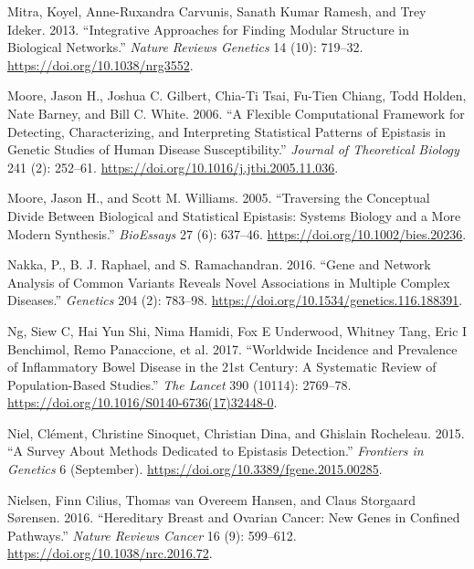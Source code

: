 \documentclass[
  11pt,
]{env/yjiao}
\newlength{\cslhangindent}
\newenvironment{cslreferences}%
  {\setlength{\parindent}{0pt}%
  \everypar{\setlength{\hangindent}{\cslhangindent}}\ignorespaces}%
  {\par}
\begin{document}
\begin{cslreferences}
\leavevmode\hypertarget{ref-mitra_integrative_2013}{}%
Mitra, Koyel, Anne-Ruxandra Carvunis, Sanath Kumar Ramesh, and Trey Ideker. 2013. ``Integrative Approaches for Finding Modular Structure in Biological Networks.'' \emph{Nature Reviews Genetics} 14 (10): 719--32. \url{https://doi.org/10.1038/nrg3552}.

\leavevmode\hypertarget{ref-moore_flexible_2006}{}%
Moore, Jason H., Joshua C. Gilbert, Chia-Ti Tsai, Fu-Tien Chiang, Todd Holden, Nate Barney, and Bill C. White. 2006. ``A Flexible Computational Framework for Detecting, Characterizing, and Interpreting Statistical Patterns of Epistasis in Genetic Studies of Human Disease Susceptibility.'' \emph{Journal of Theoretical Biology} 241 (2): 252--61. \url{https://doi.org/10.1016/j.jtbi.2005.11.036}.

\leavevmode\hypertarget{ref-moore_traversing_2005}{}%
Moore, Jason H., and Scott M. Williams. 2005. ``Traversing the Conceptual Divide Between Biological and Statistical Epistasis: Systems Biology and a More Modern Synthesis.'' \emph{BioEssays} 27 (6): 637--46. \url{https://doi.org/10.1002/bies.20236}.

\leavevmode\hypertarget{ref-nakka_gene_2016}{}%
Nakka, P., B. J. Raphael, and S. Ramachandran. 2016. ``Gene and Network Analysis of Common Variants Reveals Novel Associations in Multiple Complex Diseases.'' \emph{Genetics} 204 (2): 783--98. \url{https://doi.org/10.1534/genetics.116.188391}.

\leavevmode\hypertarget{ref-ng_worldwide_2017}{}%
Ng, Siew C, Hai Yun Shi, Nima Hamidi, Fox E Underwood, Whitney Tang, Eric I Benchimol, Remo Panaccione, et al. 2017. ``Worldwide Incidence and Prevalence of Inflammatory Bowel Disease in the 21st Century: A Systematic Review of Population-Based Studies.'' \emph{The Lancet} 390 (10114): 2769--78. \url{https://doi.org/10.1016/S0140-6736(17)32448-0}.

\leavevmode\hypertarget{ref-niel_survey_2015}{}%
Niel, Clément, Christine Sinoquet, Christian Dina, and Ghislain Rocheleau. 2015. ``A Survey About Methods Dedicated to Epistasis Detection.'' \emph{Frontiers in Genetics} 6 (September). \url{https://doi.org/10.3389/fgene.2015.00285}.

\leavevmode\hypertarget{ref-nielsen_hereditary_2016}{}%
Nielsen, Finn Cilius, Thomas van Overeem Hansen, and Claus Storgaard Sørensen. 2016. ``Hereditary Breast and Ovarian Cancer: New Genes in Confined Pathways.'' \emph{Nature Reviews Cancer} 16 (9): 599--612. \url{https://doi.org/10.1038/nrc.2016.72}.


\end{cslreferences}
\end{document}
